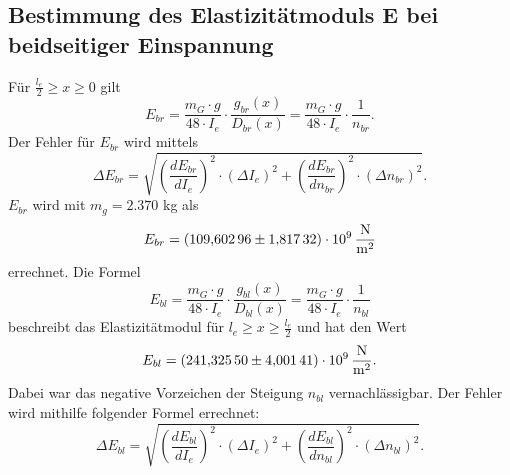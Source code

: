 \subsection{Bestimmung des Elastizitätmoduls E bei beidseitiger Einspannung}
Für $\frac{l_{e}}{2} \geq x \geq 0$ gilt
\begin{equation}
  E_{br} = \frac{m_{G} \cdot g}{48 \cdot I_{e}} \cdot \frac{g_{br}(x)}{D_{br}(x)} = \frac{m_{G} \cdot g}{48 \cdot I_{e}} \cdot \frac{1}{n_{br}}.
  \label{eqn:brela}
\end{equation}
 Der Fehler für $E_{br}$ wird mittels
\begin{equation}
    \Delta E_{br} = \sqrt{ \left(\frac{d E_{br}}{d I_{e}}\right)^2 \cdot \left(\Delta I_{e}\right)^2 + \left(\frac{d E_{br}}{d n_{br}}\right)^2 \cdot \left(\Delta n_{br}\right)^2}.
    \label{eqn:gaußebr}
\end{equation}
 $E_{br}$ wird mit $m_{g}=2.370$ kg  als
\begin{equation*}
  E_{br}=\SI{109.60296 \pm 1.81732e09}{\frac{N}{m^2}}
\end{equation*}
 errechnet.
 Die Formel
\begin{equation}
  E_{bl} = \frac{m_{G} \cdot g}{48 \cdot I_{e}} \cdot \frac{g_{bl}(x)}{D_{bl}(x)} = \frac{m_{G} \cdot g}{48 \cdot I_{e}} \cdot \frac{1}{n_{bl}}
  \label{eqn:blela}
\end{equation}
 beschreibt das Elastizitätmodul für $l_{e} \geq x \geq \frac{l_{e}}{2}$ und hat den Wert
\begin{equation*}
  E_{bl}= \SI{241.32550 \pm 4.00141e09}{\frac{N}{m^2}}.
\end{equation*}
 Dabei war das negative Vorzeichen der Steigung $n_{bl}$ vernachlässigbar.
 Der Fehler wird mithilfe folgender Formel errechnet:
\begin{equation}
    \Delta E_{bl} = \sqrt{ \left(\frac{d E_{bl}}{d I_{e}}\right)^2 \cdot \left(\Delta I_{e}\right)^2 + \left(\frac{d E_{bl}}{d n_{bl}}\right)^2 \cdot \left(\Delta n_{bl}\right)^2}.
\end{equation}
